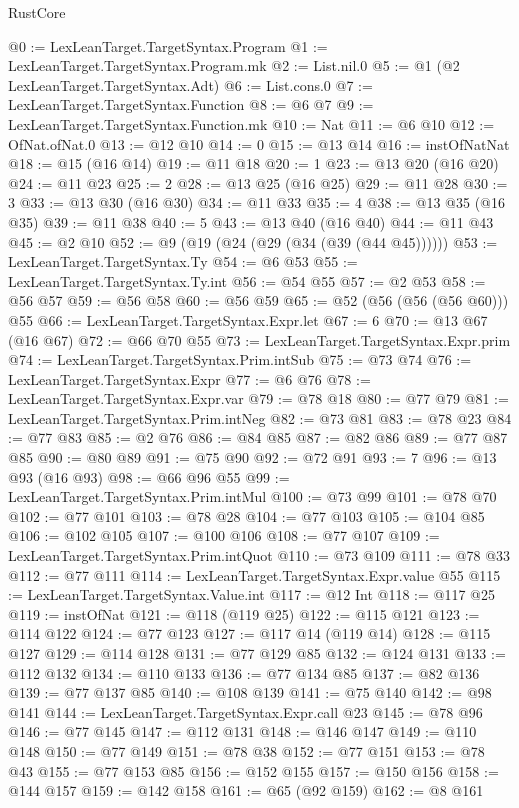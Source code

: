 \begin{lexlean}{RustCore}
\begin{coremodule}
@0 := LexLeanTarget.TargetSyntax.Program
@1 := LexLeanTarget.TargetSyntax.Program.mk
@2 := List.nil.{0}
@5 := @1 (@2 LexLeanTarget.TargetSyntax.Adt)
@6 := List.cons.{0}
@7 := LexLeanTarget.TargetSyntax.Function
@8 := @6 @7
@9 := LexLeanTarget.TargetSyntax.Function.mk
@10 := Nat
@11 := @6 @10
@12 := OfNat.ofNat.{0}
@13 := @12 @10
@14 := 0
@15 := @13 @14
@16 := instOfNatNat
@18 := @15 (@16 @14)
@19 := @11 @18
@20 := 1
@23 := @13 @20 (@16 @20)
@24 := @11 @23
@25 := 2
@28 := @13 @25 (@16 @25)
@29 := @11 @28
@30 := 3
@33 := @13 @30 (@16 @30)
@34 := @11 @33
@35 := 4
@38 := @13 @35 (@16 @35)
@39 := @11 @38
@40 := 5
@43 := @13 @40 (@16 @40)
@44 := @11 @43
@45 := @2 @10
@52 := @9 (@19 (@24 (@29 (@34 (@39 (@44 @45))))))
@53 := LexLeanTarget.TargetSyntax.Ty
@54 := @6 @53
@55 := LexLeanTarget.TargetSyntax.Ty.int
@56 := @54 @55
@57 := @2 @53
@58 := @56 @57
@59 := @56 @58
@60 := @56 @59
@65 := @52 (@56 (@56 (@56 @60))) @55
@66 := LexLeanTarget.TargetSyntax.Expr.let
@67 := 6
@70 := @13 @67 (@16 @67)
@72 := @66 @70 @55
@73 := LexLeanTarget.TargetSyntax.Expr.prim
@74 := LexLeanTarget.TargetSyntax.Prim.intSub
@75 := @73 @74
@76 := LexLeanTarget.TargetSyntax.Expr
@77 := @6 @76
@78 := LexLeanTarget.TargetSyntax.Expr.var
@79 := @78 @18
@80 := @77 @79
@81 := LexLeanTarget.TargetSyntax.Prim.intNeg
@82 := @73 @81
@83 := @78 @23
@84 := @77 @83
@85 := @2 @76
@86 := @84 @85
@87 := @82 @86
@89 := @77 @87 @85
@90 := @80 @89
@91 := @75 @90
@92 := @72 @91
@93 := 7
@96 := @13 @93 (@16 @93)
@98 := @66 @96 @55
@99 := LexLeanTarget.TargetSyntax.Prim.intMul
@100 := @73 @99
@101 := @78 @70
@102 := @77 @101
@103 := @78 @28
@104 := @77 @103
@105 := @104 @85
@106 := @102 @105
@107 := @100 @106
@108 := @77 @107
@109 := LexLeanTarget.TargetSyntax.Prim.intQuot
@110 := @73 @109
@111 := @78 @33
@112 := @77 @111
@114 := LexLeanTarget.TargetSyntax.Expr.value @55
@115 := LexLeanTarget.TargetSyntax.Value.int
@117 := @12 Int
@118 := @117 @25
@119 := instOfNat
@121 := @118 (@119 @25)
@122 := @115 @121
@123 := @114 @122
@124 := @77 @123
@127 := @117 @14 (@119 @14)
@128 := @115 @127
@129 := @114 @128
@131 := @77 @129 @85
@132 := @124 @131
@133 := @112 @132
@134 := @110 @133
@136 := @77 @134 @85
@137 := @82 @136
@139 := @77 @137 @85
@140 := @108 @139
@141 := @75 @140
@142 := @98 @141
@144 := LexLeanTarget.TargetSyntax.Expr.call @23
@145 := @78 @96
@146 := @77 @145
@147 := @112 @131
@148 := @146 @147
@149 := @110 @148
@150 := @77 @149
@151 := @78 @38
@152 := @77 @151
@153 := @78 @43
@155 := @77 @153 @85
@156 := @152 @155
@157 := @150 @156
@158 := @144 @157
@159 := @142 @158
@161 := @65 (@92 @159)
@162 := @8 @161

\end{coremodule}
\end{lexlean}
